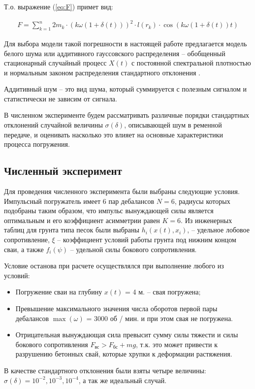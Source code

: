 Т.о. выражение (\ref{eq:F}) примет вид:

\begin{equation}
    \label{eq:F_noise}
    \begin{gathered}
        F = \sum\limits_{k = 1}^n 2 m_k \cdot (k \omega (1 + \delta(t)))^2 \cdot l(r_k) \cdot \cos (k \omega (1 + \delta(t)) t)
    \end{gathered}
\end{equation}

Для выбора модели такой погрешности в настоящей работе предлагается модель белого шума или аддитивного
гауссовского распределения -- обобщенный стационарный случайный процесс $X(t)$ с постоянной спектральной
плотностью и нормальным законом распределения стандартного отклонения \cite{yakovleva}.

\begin{definition}
    Аддитивный шум -- это вид шума, который суммируется с полезным сигналом и статистически не зависим
    от сигнала.
\end{definition}

В численном эксперименте будем рассматривать различные порядки стандартных отклонений случайной
величины $\sigma(\delta)$, описывающей шум в ременной передаче, и оценивать насколько это влияет на
основные характеристики процесса погружения.

\subsection{Численный эксперимент}

Для проведения численного эксперимента были выбраны следующие условия. Импульсный погружатель имеет 6 пар дебалансов $N=6$,
радиусы которых подобраны таким образом, что импульс вынуждающей силы является оптимальным и его коэффициент асимметрии равен $K=6$.
Из инженерных таблиц для грунта типа песок были выбраны $h_i(x(t),x_i)$, – удельное лобовое сопротивление, $\xi$ – коэффициент
условий работы грунта под нижним концом сваи, а также $f_i(\psi)$ – удельной силы бокового сопротивления.

Условие останова при расчете осуществлялся при выполнение любого из условий:
\begin{itemize}
    \item Погружение сваи на глубину $x(t)$ = 4 м. -- свая погружена;
    \item Превышение максимального значения числа оборотов первой пары дебалансов $\max(\omega)$ = 3000 об / мин.
    и при этом свая не погружена.
    \item Отрицательная вынуждающая сила превысит сумму силы тяжести и силы бокового сопротивления $F_\text{вс} > F_\text{бс} + mg $,
    т.к. это может привести к разрушению бетонных свай, которые хрупки к деформации растяжения.
\end{itemize}
В качестве стандартного отклонения были взяты четыре величины: $\sigma(\delta) = 10^{-2}, 10^{-3}, 10^{-4}$, а так же идеальный случай.

